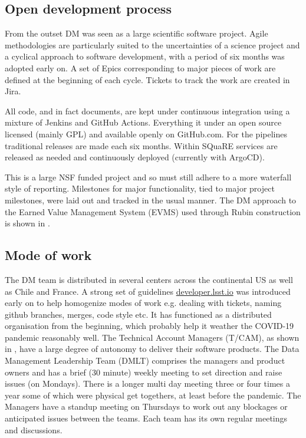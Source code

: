\subsection{Open development process}\label{sec:devproc}
From the outset DM was seen as a large scientific  software project.
Agile methodologies \cite{it:agile}  are particularly suited to the uncertainties of a science project and
a cyclical approach to software development, with a period of six months was adopted early on.
A set of Epics corresponding to major pieces of work are defined at the beginning of each cycle.
Tickets to track the work are created in Jira.

All code, and in fact documents, are kept under continuous integration using a mixture of Jenkins and GitHub Actions.
Everything it under an open source licensed (mainly GPL) and available openly on GitHub.com.
For the pipelines traditional releases are made each six months.
Within SQuaRE services are released as needed and continuously deployed (currently with ArgoCD).

This is a large NSF funded project and so must still adhere to a more waterfall style of reporting.
Milestones for major functionality, tied to major project milestones, were laid out and tracked in the usual manner.
The DM approach to the Earned Value Management System (EVMS) used through Rubin construction is shown in \cite {DMTN-020}.

\subsection{Mode of work}\label{sec:mode}
The DM  team is distributed in several centers across the continental US as well as Chile and France.
A strong set of guidelines \href{https:\\developer.lsst.io}{developer.lsst.io} was introduced early on to help homogenize modes of work e.g. dealing with tickets, naming github branches, merges, code style etc.
It has functioned as a distributed organisation from the beginning, which probably help it weather the COVID-19 pandemic reasonably well.
The Technical Account Managers (T/CAM), as shown in , have a large degree of autonomy to deliver their software products.
The Data Management Leadership Team (DMLT) comprises the managers and product owners and has a brief (30 minute) weekly meeting to set direction and raise issues (on Mondays).
There is a longer multi day meeting three or four times a year some of which were physical get togethers, at least before the pandemic.
The Managers have a standup meeting on Thursdays to work out any blockages or anticipated issues between the teams.
Each team has its own regular meetings and discussions.

